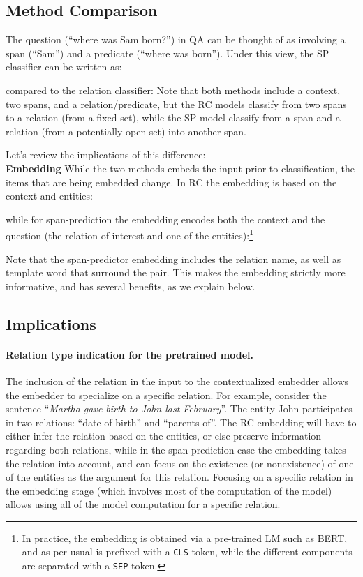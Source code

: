 \documentclass[11pt]{article}
\begin{document}
\subsection{Method Comparison} \label{ssec:compare}
The question  (``where was Sam born?'') in QA can be thought of as involving a span  (``Sam'') and a predicate  (``where was born''). Under this view, the SP classifier can be written as:
 
compared to the relation classifier: 
 Note that both methods include a context, two spans, and a relation/predicate, but the RC models classify from two spans to a relation (from a fixed set), while the SP model classify from a span and a relation (from a potentially open set) into another span.

Let's review the implications of this difference:\\

\noindent\textbf{Embedding} 
While the two methods embeds the input prior to classification, the items that are being embedded change. In RC the embedding  is based on the context and entities:

while for span-prediction the embedding 
 encodes both the context and the question (the relation of interest and one of the entities):\footnote{In practice, the embedding is obtained via a pre-trained LM such as BERT, and as per-usual is prefixed with a \texttt{CLS} token, while the different components are separated with a \texttt{SEP} token.}


Note that the span-predictor embedding includes the relation name, as well as template word that surround the  pair. This makes the embedding strictly more informative, and has several benefits, as we explain below.


\subsection{Implications}
\paragraph{Relation type indication for the pretrained model.}
The inclusion of the relation  in the input to the contextualized embedder allows the embedder to specialize on a specific relation. For example, consider the sentence ``\emph{Martha gave birth to John last February}''. The entity John participates in two relations: ``date of birth'' and ``parents of''. The RC embedding will have to either infer the relation based on the entities, or else preserve information regarding both relations, while in the span-prediction case the embedding takes the relation  into account, and can focus on the existence (or nonexistence) of one of the entities as the argument for this relation. Focusing on a specific relation in the embedding stage (which involves most of the computation of the model) allows using all of the model computation for a specific relation.
\end{document}
